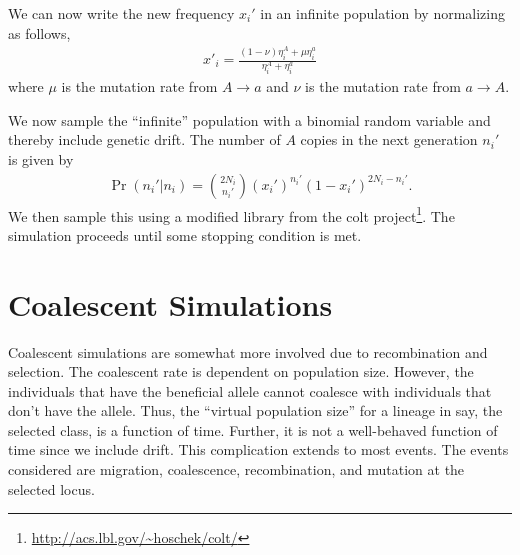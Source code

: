 \documentclass{article}
\begin{document}
We can now write the new frequency $x_i'$ in an infinite population by
normalizing as follows, 
\begin{align}
	x'_i=\frac{(1-\nu)\eta_i^A+\mu \eta_i^a}{\eta_i^A+ \eta_i^a}
	\label{normalized}
\end{align}  
where $\mu$ is the mutation rate from $A \to a$ and $\nu$ is the mutation rate  
from $a \to A$. 

We now sample the ``infinite'' population with a binomial random variable and
thereby include genetic drift. The number of $A$ copies in the next generation
$n_i'$ is given by
\begin{align}
	\Pr(n_i'|n_i)=\binom{2N_i}{n_i'} (x_i')^{n_i'}(1-x_i')^{2N_i-n_i'}.
	\label{eq:binom}
\end{align}
We then sample this using a modified library from the colt
project\footnote{\url{http://acs.lbl.gov/~hoschek/colt/}}. The simulation
proceeds until some stopping condition is met. 

% 
% 

\section{Coalescent Simulations}

Coalescent simulations are somewhat more involved due to recombination and
selection. The coalescent rate is dependent on population size. However, the
individuals that have the beneficial allele cannot coalesce with individuals that
don't have the allele. Thus, the ``virtual population size'' for a lineage in
say, the selected class, is a function of time. Further, it is not a
well-behaved function of time since we include drift. This complication extends
to most events. The events considered are migration, coalescence, recombination,
and mutation at the selected locus.
\end{document}
